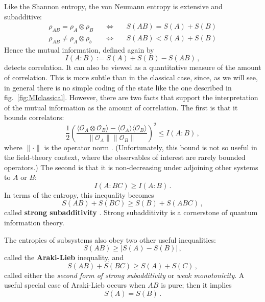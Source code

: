 \documentclass[11pt]{article}
\newcommand{\ev}[1]{\langle{#1}\rangle}
\newcommand{\OO}{\mathcal{O}}
\begin{document}
Like the Shannon entropy, the von Neumann entropy is extensive and subadditive:
\begin{eqnarray}
\rho_{AB}=\rho_A\otimes\rho_B\quad&\Leftrightarrow&\quad S(AB)=S(A)+S(B)\\
\rho_{AB}\neq\rho_A\otimes\rho_b\quad&\Leftrightarrow&\quad S(AB)<S(A)+S(B)
\end{eqnarray}
Hence the mutual information, defined again by
\begin{equation}
I(A:B):=S(A)+S(B)-S(AB)\,,
\end{equation}
detects correlation. It can also be viewed as a quantitative measure of the amount of correlation. This is more subtle than in the classical case, since, as we will see, in general there is no simple coding of the state like the one described in fig.\ \ref{fig:MIclassical}. However, there are two facts that support the interpretation of the mutual information as the amount of correlation. The first is that it bounds correlators:
\begin{equation}
\frac12\left(\frac{\ev{\OO_A\otimes\OO_B} - \ev{\OO_A}\ev{\OO_B}}{\|\OO_A\|\|\OO_B\|}\right)^2\le I(A:B)\,,
\end{equation}
where $\|\cdot\|$ is the operator norm \cite{HiaiOT81,PhysRevLett.100.070502}. (Unfortunately, this bound is not so useful in the field-theory context, where the observables of interest are rarely bounded operators.) The second is that it is non-decreasing under adjoining other systems to $A$ or $B$:
\begin{equation}
I(A:BC)\ge I(A:B)\,.
\end{equation}
In terms of the entropy, this inequality becomes
\begin{equation}\label{SSA1}
S(AB)+S(BC)\ge S(B)+S(ABC)\,,
\end{equation}
called \textbf{strong subadditivity} \cite{LiebRuskai}. Strong subadditivity is a cornerstone of quantum information theory.

The entropies of subsystems also obey two other useful inequalities:
\begin{equation}\label{arakilieb}
S(AB)\ge|S(A)-S(B)|\,,
\end{equation}
called the \textbf{Araki-Lieb} inequality,
and
\begin{equation}\label{SSA2}
S(AB)+S(BC)\ge S(A)+S(C)\,,
\end{equation}
called either the \emph{second form of strong subadditivity} or \emph{weak monotonicity}. A useful special case of Araki-Lieb occurs when $AB$ is pure; then it implies
\begin{equation}\label{pure}
S(A)=S(B)\,.
\end{equation}
\end{document}
